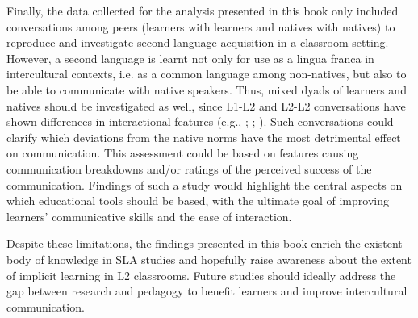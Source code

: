 Finally, the data collected for the analysis presented in this book only included conversations among peers (learners with learners and natives with natives) to reproduce and investigate second language acquisition in a classroom setting. However, a second language is learnt not only for use as a lingua franca in intercultural contexts, i.e. as a common language among non-natives, but also to be able to communicate with native speakers. Thus, mixed dyads of learners and natives should be investigated as well, since L1-L2 and L2-L2 conversations have shown differences in interactional features (e.g., \citealt{Shibata2023}; \citealt{KunitzYeh2023}; \citealt{JungCrossley2024}). Such conversations could clarify which deviations from the native norms have the most detrimental effect on communication. This assessment could be based on features causing communication breakdowns and/or ratings of the perceived success of the communication. Findings of such a study would highlight the central aspects on which educational tools should be based, with the ultimate goal of improving learners’ communicative skills and the ease of interaction.

Despite these limitations, the findings presented in this book enrich the existent body of knowledge in SLA studies and hopefully raise awareness about the extent of implicit learning in L2 classrooms. Future studies should ideally address the gap between research and pedagogy to benefit learners and improve intercultural communication.
